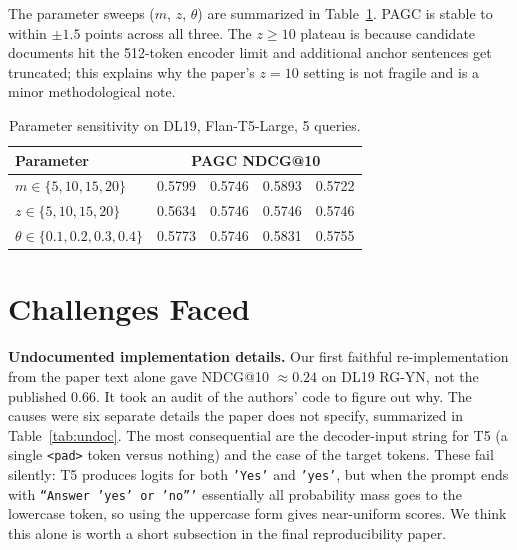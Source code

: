 \documentclass[conference]{IEEEtran}
\begin{document}
The parameter sweeps ($m$, $z$, $\theta$) are summarized in Table~\ref{tab:params}. PAGC is stable to within $\pm 1.5$ points across all three. The $z \geq 10$ plateau is because candidate documents hit the 512-token encoder limit and additional anchor sentences get truncated; this explains why the paper's $z{=}10$ setting is not fragile and is a minor methodological note.

\begin{table}[h]
\centering
\small
\begin{tabular}{@{}lcccc@{}}
\toprule
\textbf{Parameter} & \multicolumn{4}{c}{\textbf{PAGC NDCG@10}} \\
\midrule
$m \in \{5,10,15,20\}$           & 0.5799 & 0.5746 & 0.5893 & 0.5722 \\
$z \in \{5,10,15,20\}$           & 0.5634 & 0.5746 & 0.5746 & 0.5746 \\
$\theta \in \{0.1,0.2,0.3,0.4\}$ & 0.5773 & 0.5746 & 0.5831 & 0.5755 \\
\bottomrule
\end{tabular}
\caption{Parameter sensitivity on DL19, Flan-T5-Large, 5 queries.}
\label{tab:params}
\end{table}

\section{Challenges Faced}
\label{sec:challenges}

\textbf{Undocumented implementation details.}
Our first faithful re-implementation from the paper text alone gave NDCG@10 $\approx 0.24$ on DL19 RG-YN, not the published 0.66. It took an audit of the authors' code to figure out why. The causes were six separate details the paper does not specify, summarized in Table~\ref{tab:undoc}. The most consequential are the decoder-input string for T5 (a single \texttt{<pad>} token versus nothing) and the case of the target tokens. These fail silently: T5 produces logits for both \texttt{'Yes'} and \texttt{'yes'}, but when the prompt ends with \texttt{``Answer 'yes' or 'no'''} essentially all probability mass goes to the lowercase token, so using the uppercase form gives near-uniform scores. We think this alone is worth a short subsection in the final reproducibility paper.
\end{document}

